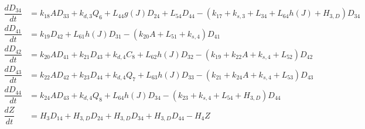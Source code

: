\begin{align*}
\dfrac{dD_{34}}{dt} & =k_{18}AD_{33}+k_{d,3}Q_{6}+L_{44}g\left(J\right)D_{24}+L_{54}D_{44}-\left(k_{17}+k_{s,3}+L_{34}+L_{64}h\left(J\right)+H_{3,D}\right)D_{34}\\
\dfrac{dD_{41}}{dt} & =k_{19}D_{42}+L_{61}h\left(J\right)D_{31}-\left(k_{20}A+L_{51}+k_{s,4}\right)D_{41}\\
\dfrac{dD_{42}}{dt} & =k_{20}AD_{41}+k_{21}D_{43}+k_{d,4}C_{8}+L_{62}h\left(J\right)D_{32}-\left(k_{19}+k_{22}A+k_{s,4}+L_{52}\right)D_{42}\\
\dfrac{dD_{43}}{dt} & =k_{22}AD_{42}+k_{23}D_{44}+k_{d,4}Q_{7}+L_{63}h\left(J\right)D_{33}-\left(k_{21}+k_{24}A+k_{s,4}+L_{53}\right)D_{43}\\
\dfrac{dD_{44}}{dt} & =k_{24}AD_{43}+k_{d,4}Q_{8}+L_{64}h\left(J\right)D_{34}-\left(k_{23}+k_{s,4}+L_{54}+H_{3,D}\right)D_{44}\\
\dfrac{dZ}{dt} & =H_{3}D_{14}+H_{3,D}D_{24}+H_{3,D}D_{34}+H_{3,D}D_{44}-H_{4}Z
\end{align*}
